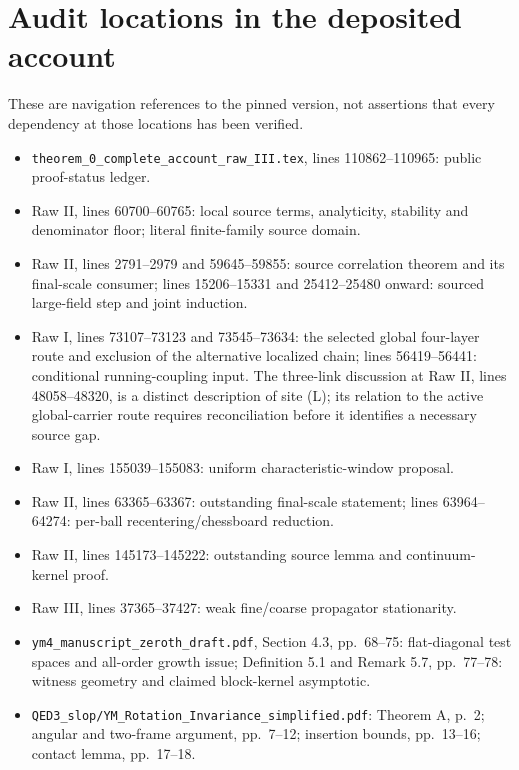 \documentclass[11pt]{article}
\theoremstyle{remark}
\begin{document}
\section*{Audit locations in the deposited account}
\small
These are navigation references to the pinned version, not assertions
that every dependency at those locations has been verified.
\begin{itemize}
\item \texttt{theorem\_0\_complete\_account\_raw\_III.tex},
lines 110862--110965: public proof-status ledger.
\item Raw II, lines 60700--60765: local source terms, analyticity,
stability and denominator floor; literal finite-family source domain.
\item Raw II, lines 2791--2979 and 59645--59855: source correlation
theorem and its final-scale consumer; lines 15206--15331 and
25412--25480 onward: sourced large-field step and joint induction.
\item Raw I, lines 73107--73123 and 73545--73634: the selected global
four-layer route and exclusion of the alternative localized chain;
lines 56419--56441: conditional running-coupling input.
The three-link discussion at Raw II, lines 48058--48320, is a distinct
description of site (L); its relation to the active global-carrier route
requires reconciliation before it identifies a necessary source gap.
\item Raw I, lines 155039--155083:
uniform characteristic-window proposal.
\item Raw II, lines 63365--63367:
outstanding final-scale statement; lines 63964--64274:
per-ball recentering/chessboard reduction.
\item Raw II, lines 145173--145222:
outstanding source lemma and continuum-kernel proof.
\item Raw III, lines 37365--37427:
weak fine/coarse propagator stationarity.
\item \texttt{ym4\_manuscript\_zeroth\_draft.pdf},
Section 4.3, pp.\ 68--75: flat-diagonal test spaces and all-order
growth issue; Definition 5.1 and Remark 5.7, pp.\ 77--78:
witness geometry and claimed block-kernel asymptotic.
\item \texttt{QED3\_slop/YM\_Rotation\_Invariance\_simplified.pdf}:
Theorem A, p.\ 2; angular and two-frame argument, pp.\ 7--12;
insertion bounds, pp.\ 13--16; contact lemma, pp.\ 17--18.
\end{itemize}
\normalsize
\end{document}
